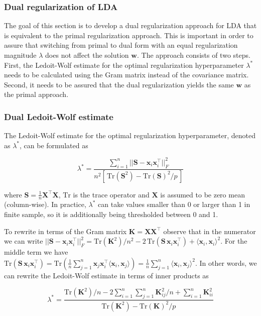 \documentclass[utf8]{frontiersSCNS} %
\newcommand{\w}{\mathbf{w}}
\newcommand{\x}{\mathbf{x}}
\newcommand{\K}{\mathbf{K}}
\renewcommand{\S}{\mathbf{S}}
\newcommand{\Tr}[1]{\text{Tr}(#1)}
\newcommand{\X}{\mathbf{X}}
\begin{document}
\subsubsection{Dual regularization of LDA}\label{app:dualLDA}

The goal of this section is to develop a dual regularization approach for LDA that is equivalent to the primal regularization approach. This is important in order to assure that switching from primal to dual form with an equal regularization magnitude $\lambda$ does not affect the solution $\w$. The approach consists of two steps. First, the Ledoit-Wolf estimate for the optimal regularization hyperparameter $\lambda^*$ needs to be calculated using the Gram matrix instead of the covariance matrix. Second, it needs to be assured that the dual regularization yields the same $\w$ as the primal approach.

\subsubsection{Dual Ledoit-Wolf estimate}

The Ledoit-Wolf estimate \citep{Ledoit2003HoneyMatrix,Blankertz2011} for the optimal regularization hyperparameter, denoted as $\lambda^*$, can be formulated as

\begin{equation}\label{eq:LedoitWolf}
\lambda^* = \frac{\sum_{i=1}^n ||\S - \x_i\x_i^\top||_F^2}%
{n^2 [\,\Tr{\S^2} - \Tr{\S}^2/p\,]}
\end{equation}

where $\mathbf{S}= \frac{1}{n}\X^\top\X$, $\text{Tr}$ is the trace operator and $\X$ is assumed to be zero mean (column-wise). In practice, $\lambda^*$ can take values smaller than 0 or larger than 1 in finite sample, so it is additionally being thresholded between 0 and 1.

To rewrite  in terms of the Gram matrix $\K= \X\X^\top$ observe that in the numerator we can write $||\S - \x_i\x_i^\top||_F^2 = \Tr{\K^2}/n^2 - 2\,\Tr{\S\,\x_i\x_i^\top} + \langle\x_i,\x_i\rangle^2$. For the middle term we have $\Tr{\S\,\x_i\x_i^\top} = \Tr{\frac{1}{n}\sum_{j=1}^n \x_j\x_i^\top\langle\x_i,\x_j\rangle} = \frac{1}{n}\sum_{j=1}^n \langle\x_i,\x_j\rangle^2$. In other words, we can rewrite the Ledoit-Wolf estimate in terms of inner products as

\begin{equation}\label{eq:LedoitWolfDual}
\lambda^* = \frac{\Tr{\K^2}/n - 2\sum_{i=1}^n\sum_{j=1}^n \K_{ij}^2/n + \sum_{i=1}^n \K_{ii}^2 }%
{\Tr{\K^2} - \Tr{\K}^2/p}
\end{equation}
\end{document}
